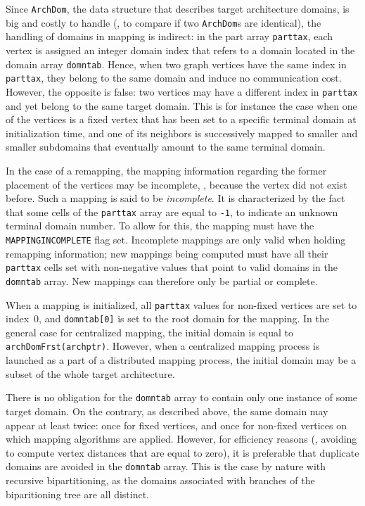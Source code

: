 Since \texttt{ArchDom}, the data structure that describes target
architecture domains, is big and costly to handle (\eg, to compare if
two \texttt{ArchDom}s are identical), the handling of domains in
mapping is indirect: in the part array \texttt{parttax}, each vertex
is assigned an integer domain index that refers to a domain located in
the domain array \texttt{domntab}. Hence, when two graph vertices have
the same index in \texttt{parttax}, they belong to the same domain and
induce no communication cost. However, the opposite is false: two
vertices may have a different index in \texttt{parttax} and yet belong
to the same target domain. This is for instance the case when one of
the vertices is a fixed vertex that has been set to a specific
terminal domain at initialization time, and one of its neighbors is
successively mapped to smaller and smaller subdomains that eventually
amount to the same terminal domain.

In the case of a remapping, the mapping information regarding the
former placement of the vertices may be incomplete, \eg, because the
vertex did not exist before. Such a mapping is said to be
\textit{incomplete}. It is characterized by the fact that some cells
of the \texttt{parttax} array are equal to \texttt{-1}, to indicate an
unknown terminal domain number. To allow for this, the mapping must
have the \texttt{MAPPING\lbt INCOMPLETE} flag set. Incomplete mappings
are only valid when holding remapping information; new mappings being
computed must have all their \texttt{parttax} cells set with
non-negative values that point to valid domains in the
\texttt{domntab} array. New mappings can therefore only be partial or
complete.

When a mapping is initialized, all \texttt{parttax} values for
non-fixed vertices are set to index~$0$, and \texttt{domntab[0]} is
set to the root domain for the mapping. In the general case for
centralized mapping, the initial domain is equal to
\texttt{archDomFrst(archptr)}. However, when a centralized mapping
process is launched as a part of a distributed mapping process, the
initial domain may be a subset of the whole target architecture.

There is no obligation for the \texttt{domntab} array to contain only
one instance of some target domain. On the contrary, as described
above, the same domain may appear at least twice: once for fixed
vertices, and once for non-fixed vertices on which mapping algorithms
are applied. However, for efficiency reasons (\eg, avoiding to compute
vertex distances that are equal to zero), it is preferable that
duplicate domains are avoided in the \texttt{domntab} array. This is
the case by nature with recursive bipartitioning, as the domains
associated with branches of the biparitioning tree are all distinct.

